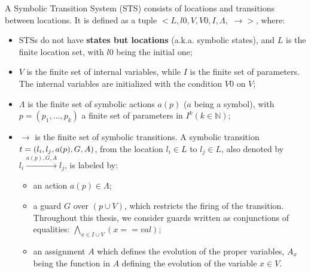 \begin{definition}
	A Symbolic Transition System (STS) consists of locations and
    transitions between locations. It is defined as a tuple $<
    L,l0,V,V0,I,\Lambda,$ $\rightarrow>$, where:

	\begin{itemize}
        \item STSs do not have \textbf{states but locations}
        (a.k.a. symbolic states), and $L$ is the finite location
        set, with $l0$ being the initial one;

        \item $V$ is the finite set of internal variables, while
        $I$ is the finite set of parameters. The internal
        variables are initialized with the condition $V0$ on
        $V$;

        \item $\Lambda$ is the finite set of symbolic actions
        $a(p)$ ($a$ being a symbol), with $p=(p_1,\dots ,p_k)$ a
        finite set of parameters in $I^{k} (k \in \mathbb{N})$;

        \item $\rightarrow$ is the finite set of symbolic
            transitions. A symbolic transition $t =
            (l_i,l_j,a(p),G,\\A)$, from the location $l_i \in L$
            to $l_j \in L$, also denoted by $l_i
            \xrightarrow{a(p),G,A} l_j$, is labeled by:

		\begin{itemize}
            \item an action $a(p) \in \Lambda$;

            \item a guard $G$ over $(p \cup V)$, which
            restricts the firing of the transition. Throughout
            this thesis, we consider guards written as
            conjunctions of equalities: $\displaystyle
            \bigwedge_{x \in I \cup V} (x == val)$;

            \item an assignment $A$ which defines the evolution
            of the proper variables, $A_x$ being the function in
            $A$ defining the evolution of the variable $x \in V$.
		\end{itemize}
	\end{itemize}

	\label{def:sts}
\end{definition}

